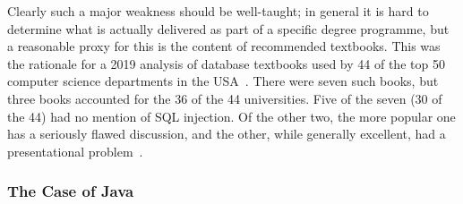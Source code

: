 \documentclass[sigconf]{acmart}
\begin{document}

Clearly such a major weakness should be well-taught; in general it is hard to determine what is actually delivered as part of a specific degree programme, but a reasonable proxy for this is the content of recommended textbooks. This was the rationale for a 2019 analysis of database textbooks used by 44 of the top 50 computer science departments in the USA~\cite{Drop2019}.  There were seven such books, but three books accounted for the 36 of the 44 universities. Five of the seven (30 of the 44) had no mention of SQL injection. Of the other two, the more popular one has a seriously flawed discussion, and the other, while generally excellent, had a presentational problem~\cite{Drop2019}.

\subsubsection{The Case of Java}
\begin{comment}
Took out footnotes for space

Many textbooks go nowhere near security applications.  But this means that the programmer who has to implement security is left to the documentation of the package/API being used, and to informal resources. \cite{Mengetal2018a} analysed 503 cybersecurity-related postings on the popular Stack Overflow online resource.  53\% were about the Spring Security framework  \footnote{\url{https://projects.spring.io/spring-security/}}, dominated by authentication (45\%). The discussion \cite[\S4.3.1]{Mengetal2018a} of cross-site request forgery (CSRF) is especially worrying.  By default, Spring implicitly enables protection against this. But all the accepted answers to CSRF-related failures simply suggested disabling the check. There were no negative comments about this, and indeed a typical response is 
\end{comment}
\end{document}
